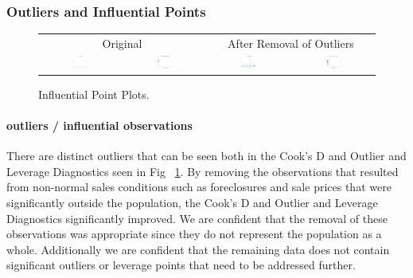 \documentclass[11pt]{scrartcl} %
\begin{document}
\subsubsection{Outliers and Influential Points}
\begin{figure}[h] %
	\centering
	\begin{tabular}{p{} p{}p{}p{}}
\hline	
	\multicolumn{2}{|c|}{Original} &  \multicolumn{2}{|c|}{After Removal of Outliers} \\
		\multicolumn{1}{|c}{\includegraphics[width=0.23\textwidth]{../graphics/A1Cooks1}} &
		\multicolumn{1}{c|}{\includegraphics[width=0.23\textwidth]{../graphics/A1Lev1}} &
		\multicolumn{1}{|c}{\includegraphics[width=0.23\textwidth]{../graphics/A1Cooks2}} &
		\multicolumn{1}{c|}{\includegraphics[width=0.23\textwidth]{../graphics/A1Lev2}}\\
		\hline
	\end{tabular}		
	\caption{Influential Point Plots.}
	\label{fig:A1IP}
\end{figure}
\paragraph{outliers / influential observations} There are distinct outliers that can be seen both in the Cook's D and Outlier and Leverage Diagnostics seen in Fig ~\ref{fig:A1IP}. By removing the observations that resulted from non-normal sales conditions such as foreclosures and sale prices that were significantly outside the population, the Cook's D and Outlier and Leverage Diagnostics significantly improved. We are confident that the removal of these observations was appropriate since they do not represent the population as a whole. Additionally we are confident that the remaining data does not contain significant outliers or leverage points that need to be addressed further.
\end{document}

